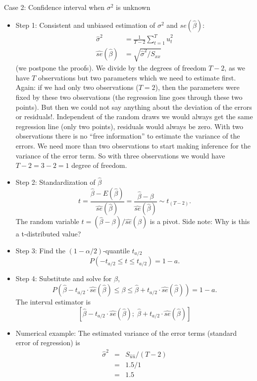 \documentclass{article}
\begin{document}
Case 2: Confidence interval when $\sigma ^{2}$ is unknown
\begin{itemize}
\item Step 1: Consistent and unbiased estimation of $\sigma ^{2}$ and $se(\hat{\beta})$:
\begin{align*}
\hat{\sigma}^2 & =\frac{1}{T-2}\sum_{t=1}^{T}\hat{u}_{t}^{2} \\
\widehat{se}(\hat{\beta})&=\sqrt{\hat{\sigma}^{2}/S_{xx}} 
\end{align*}
 (we postpone the proofs). We divide by the degrees of freedom $T-2$, as we have $T$ observations but two parameters which we need to estimate first. Again: if we had only two observations ($T=2$), then the parameters were fixed by these two observations (the regression line goes through these two points). But then we could not say anything about the deviation of the errors or residuals!. Independent of the random draws we would always get the same regression line (only two points), residuals would always be zero. With two observations there is no \enquote{free information} to estimate the variance of the errors. We need more than two observations to start making inference for the variance of the error term. So with three observations we would have $T-2=3-2=1$ degree of freedom.
\item Step 2: Standardization of $\hat{\beta}$%
\[ t=\frac{\hat{\beta}-E(\hat{\beta})}{\widehat{se}(\hat{\beta})}
=\frac{\hat{\beta}-\beta }{\widehat{se}(\hat{\beta})}\sim t_{(T-2)}. \]
The random variable $t=(\hat{\beta}-\beta )/\widehat{se}(\hat{\beta})$
is a pivot.
Side note: Why is this a t-distributed value?
\item Step 3: Find the $\left( 1-\alpha /2\right) $-quantile $t_{a/2}$
\[ P(-t_{a/2}\leq t\leq t_{a/2})=1-a. \]
\item Step 4: Substitute and solve for $\beta $,
\[ P(\hat{\beta}-t_{a/2}\cdot \widehat{se}(\hat{\beta})\leq \beta \leq \hat{\beta}
+t_{a/2}\cdot \widehat{se}(\hat{\beta}))=1-a. \]
The interval estimator is
\[ \left[ \hat{\beta}-t_{a/2}\cdot \widehat{se}(\hat{\beta});\;\hat{\beta}
+t_{a/2}\cdot \widehat{se}(\hat{\beta})\right] \]
\item Numerical example:
The estimated variance of the error terms (standard error of regression) is%
\begin{eqnarray*}
	\hat{\sigma}^{2} &=&S_{\hat{u}\hat{u}}/\left( T-2\right) \\
	&=&1.5/1 \\
	&=&1.5
\end{eqnarray*}%

\end{itemize}
\end{document}

